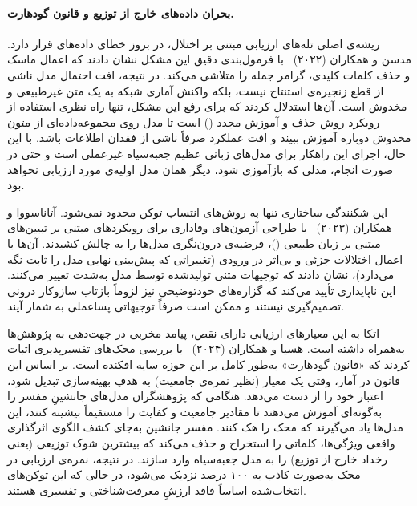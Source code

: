 \paragraph{بحران داده‌های خارج از توزیع و قانون گودهارت.}

ریشه‌ی اصلی تله‌های ارزیابی مبتنی بر اختلال، در بروز خطای داده‌های  قرار دارد. مدسن و همکاران (۲۰۲۲)~\cite{madsen2022evaluating} با فرمول‌بندی دقیق این مشکل نشان دادند که اعمال ماسک و حذف کلمات کلیدی، گرامر جمله را متلاشی می‌کند. در نتیجه، افت احتمال مدل ناشی از قطع زنجیره‌ی استنتاج نیست، بلکه واکنش آماری شبکه به یک متن غیرطبیعی و مخدوش است. آن‌ها استدلال کردند که برای رفع این مشکل، تنها راه نظری استفاده از رویکرد روش حذف و آموزش مجدد () است تا مدل روی مجموعه‌داده‌ای از متون مخدوش دوباره آموزش ببیند و افت عملکرد صرفاً ناشی از فقدان اطلاعات باشد. با این حال، اجرای این راهکار برای مدل‌های زبانی عظیم جعبه‌سیاه غیرعملی است و حتی در صورت انجام، مدلی که بازآموزی شود، دیگر همان مدل اولیه‌ی مورد ارزیابی نخواهد بود.

این شکنندگی ساختاری تنها به روش‌های انتساب توکن محدود نمی‌شود. آتاناسووا و همکاران (۲۰۲۳)~\cite{atanasova2023faithfulness} با طراحی آزمون‌های وفاداری برای رویکردهای مبتنی بر تبیین‌های مبتنی بر زبان طبیعی ()، فرضیه‌ی درون‌نگری مدل‌ها را به چالش کشیدند. آن‌ها با اعمال اختلالات جزئی و بی‌اثر در ورودی (تغییراتی که پیش‌بینی نهایی مدل را ثابت نگه می‌دارد)، نشان دادند که توجیهات متنی تولیدشده توسط مدل به‌شدت تغییر می‌کنند. این ناپایداری تأیید می‌کند که گزاره‌های خودتوضیحی نیز لزوماً بازتاب سازوکار درونی تصمیم‌گیری نیستند و ممکن است صرفاً توجیهاتی پساعملی به شمار آیند.

اتکا به این معیارهای ارزیابی دارای نقص، پیامد مخربی در جهت‌دهی به پژوهش‌ها به‌همراه داشته است. هسیا و همکاران (۲۰۲۴)~\cite{hsia2024goodhart} با بررسی محک‌های تفسیرپذیری اثبات کردند که «قانون گودهارت» به‌طور کامل بر این حوزه سایه افکنده است. بر اساس این قانون در آمار، وقتی یک معیار (نظیر نمره‌ی جامعیت) به هدفِ بهینه‌سازی تبدیل شود، اعتبار خود را از دست می‌دهد. هنگامی که پژوهشگران مدل‌های جانشینِ مفسر را به‌گونه‌ای آموزش می‌دهند تا مقادیر جامعیت و کفایت را مستقیماً بیشینه کنند، این مدل‌ها یاد می‌گیرند که محک را هک کنند. مفسر جانشین به‌جای کشف الگوی اثرگذاری واقعی ویژگی‌ها، کلماتی را استخراج و حذف می‌کند که بیشترین شوک توزیعی (یعنی رخداد خارج از توزیع) را به مدل جعبه‌سیاه وارد سازند. در نتیجه، نمره‌ی ارزیابی در محک به‌صورت کاذب به ۱۰۰ درصد نزدیک می‌شود، در حالی که این توکن‌های انتخاب‌شده اساساً فاقد ارزشِ معرفت‌شناختی و تفسیری هستند.

